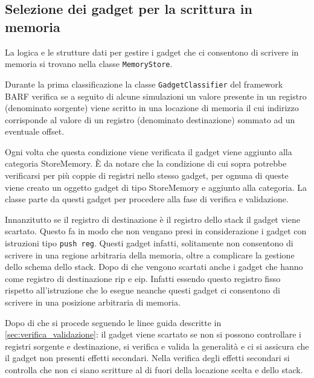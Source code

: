 \subsection{Selezione dei gadget per la scrittura in memoria}
\label{sec:memorystore}

La logica e le strutture dati per gestire i gadget che ci consentono
di scrivere in memoria si trovano nella classe
\lstinline{MemoryStore}. 

Durante la prima classificazione la classe
\lstinline{GadgetClassifier} del framework BARF verifica se a seguito
di alcune simulazioni un valore presente in un registro (denominato
sorgente) viene scritto in una locazione di memoria il cui indirizzo
corrisponde al valore di un registro (denominato destinazione) sommato
ad un eventuale offset.

Ogni volta che questa condizione viene verificata il gadget viene
aggiunto alla categoria StoreMemory. È da notare che la condizione di
cui sopra potrebbe verificarsi per più coppie di registri nello stesso
gadget, per ognuna di queste viene creato un oggetto gadget di tipo
StoreMemory e aggiunto alla categoria. La classe parte da questi
gadget per procedere alla fase di verifica e validazione.

Innanzitutto se il registro di destinazione è il registro dello stack
il gadget viene scartato. Questo fa in modo che non vengano presi in
considerazione i gadget con istruzioni tipo \lstinline{push reg}.
Questi gadget infatti, solitamente non consentono di scrivere in una
regione arbitraria della memoria, oltre a complicare la gestione dello
schema dello stack. Dopo di che vengono scartati anche i gadget che
hanno come registro di destinazione rip e eip. Infatti essendo questo
registro fisso rispetto all'istruzione che lo esegue neanche questi
gadget ci consentono di scrivere in una posizione arbitraria di
memoria.

Dopo di che si procede seguendo le linee guida descritte in
\ref{sec:verifica_validazione}: il gadget viene scartato se non si
possono controllare i registri sorgente e destinazione, si verifica e
valida la generalità e ci si assicura che il gadget non presenti
effetti secondari. Nella verifica degli effetti secondari si controlla
che non ci siano scritture al di fuori della locazione scelta e dello
stack.

